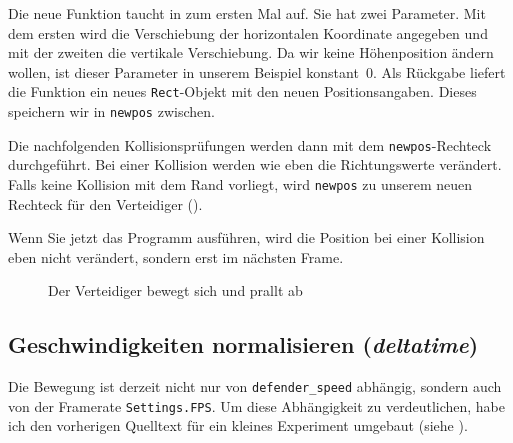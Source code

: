 Die neue Funktion taucht in  zum ersten Mal auf. Sie hat zwei Parameter. Mit dem ersten wird die Verschiebung der horizontalen Koordinate angegeben und mit der zweiten die vertikale Verschiebung. Da wir keine Höhenposition ändern wollen, ist dieser Parameter in unserem Beispiel konstant~0. Als Rückgabe liefert die Funktion ein neues \texttt{Rect}-Objekt mit den neuen Positionsangaben. Dieses speichern wir in \texttt{newpos} zwischen.

Die nachfolgenden Kollisionsprüfungen werden dann mit dem \texttt{newpos}-Rechteck durchgeführt. Bei einer Kollision werden wie eben die Richtungswerte verändert. Falls keine Kollision mit dem Rand vorliegt, wird \texttt{newpos} zu unserem neuen Rechteck für den Verteidiger ().

Wenn Sie jetzt das Programm ausführen, wird die Position bei einer Kollision eben nicht verändert, sondern erst im nächsten Frame.

\begin{figure}[H]
\begin{center}
\caption{Der Verteidiger bewegt sich und prallt ab}\label{picBewegung01}
\end{center}
\end{figure}

\subsection{Geschwindigkeiten normalisieren (\emph{deltatime})}
Die Bewegung ist derzeit nicht nur von \texttt{defender\_speed} abhängig, sondern auch von der Framerate \texttt{Settings.FPS}. Um diese Abhängigkeit zu verdeutlichen, habe ich den vorherigen Quelltext für ein kleines Experiment umgebaut (siehe ).

